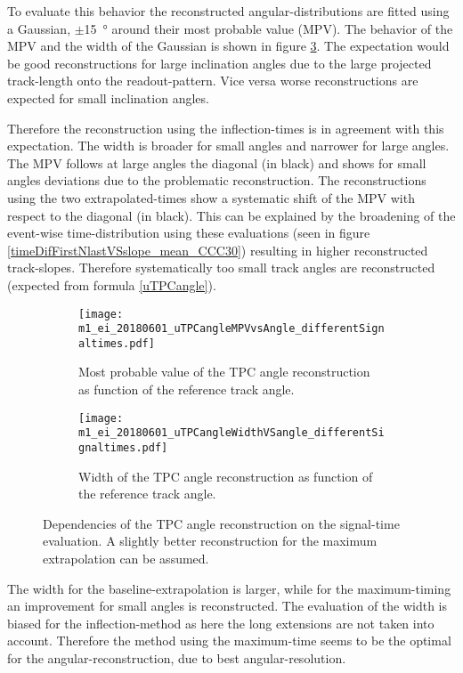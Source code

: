 \documentclass[
twoside,            %
BCOR1.4cm,          %
10pt,               %
headings=normal,    %
headsepline,        %
clearplainpage,		%
final,              %
div=14,
open=right,
bibliography=toc
]{scrreprt}
\begin{document}
To evaluate this behavior the reconstructed angular-distributions are fitted using a Gaussian, $\pm$\SI{15}{\degree} around their most probable value (MPV).
The behavior of the MPV and the width of the Gaussian is shown in figure \ref{uTPCangleProperties}.
The expectation would be good reconstructions for large inclination angles due to the large projected track-length onto the readout-pattern.
Vice versa worse reconstructions are expected for small inclination angles.

Therefore the reconstruction using the inflection-times is in agreement with this expectation.
The width is broader for small angles and narrower for large angles.
The MPV follows at large angles the diagonal (in black) and shows for small angles deviations due to the problematic reconstruction.
The reconstructions using the two extrapolated-times show a systematic shift of the MPV with respect to the diagonal (in black).
This can be explained by the broadening of the event-wise time-distribution using these evaluations (seen in figure \ref{timeDifFirstNlastVSslope_mean_CCC30}) resulting in higher reconstructed track-slopes.
Therefore systematically too small track angles are reconstructed (expected from formula \ref{uTPCangle}).

\begin{figure}[!h]
	\begin{subfigure}[b]{0.48\textwidth}
		\centering
		\texttt{[image: m1\_ei\_20180601\_uTPCangleMPVvsAngle\_differentSignaltimes.pdf]}
		\caption{Most probable value of the \textmu TPC angle reconstruction as function of the reference track angle.}
		\label{uTPCangleMeanVSangle} 
	\end{subfigure}
	\hfill
	\begin{subfigure}[b]{0.48\textwidth}
		\centering
		\texttt{[image: m1\_ei\_20180601\_uTPCangleWidthVSangle\_differentSignaltimes.pdf]}
		\caption{Width of the \textmu TPC angle reconstruction as function of the reference track angle.}
		\label{uTPCangleWidthVSangle} 
	\end{subfigure}
	\vspace{-2mm}
	\caption{
		Dependencies of the \textmu TPC angle reconstruction on the signal-time evaluation.
		A slightly better reconstruction for the maximum extrapolation can be assumed.
	}
	\label{uTPCangleProperties}
\end{figure}

The width for the baseline-extrapolation is larger, while for the maximum-timing an improvement for small angles is reconstructed.
The evaluation of the width is biased for the inflection-method as here the long extensions are not taken into account.
Therefore the method using the maximum-time seems to be the optimal for the angular-reconstruction, due to best angular-resolution.
\end{document}
